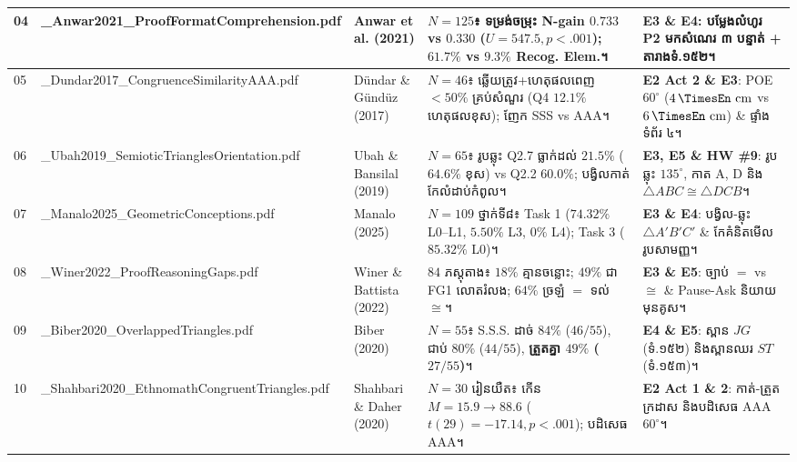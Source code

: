 \documentclass[a4paper,12pt]{article}
\newcommand{\en}[1]{{\TimesEn #1}}
\newcommand{\unit}[1]{\,\text{\en{#1}}}
\newcommand{\tri}[1]{\ensuremath{\triangle #1}}
\newcommand{\cg}{\ensuremath{\cong}}
\begin{document}
\begin{longtable}{|C{0.65cm}|L{4.05cm}|L{2.55cm}|L{5.35cm}|L{3.90cm}|}
04 & \en{04\_\allowbreak Anwar2021\_\allowbreak ProofFormat\allowbreak Comprehension.pdf} & \en{Anwar et al. (2021)} &
$N=125$៖ ទម្រង់ចម្រុះ \en{N-gain} $0.733$ vs $0.330$ ($U=547.5, p<.001$); $61.7\%$ vs $9.3\%$ \en{Recog. Elem.}។ &
\textbf{E3 \& E4}: បម្លែងលំហូរ \en{P2} មកសំណេរ ៣ បន្ទាត់ + តារាងទំ.១៥២។ \\ \hline

05 & \en{05\_\allowbreak Dundar2017\_\allowbreak Congruence\allowbreak SimilarityAAA.pdf} & \en{Dündar \& Gündüz (2017)} &
$N=46$៖ ឆ្លើយត្រូវ+ហេតុផលពេញ $<50\%$ គ្រប់សំណួរ (\en{Q4} $12.1\%$ ហេតុផលខុស); ញែក \en{SSS} vs \en{AAA}។ &
\textbf{E2 Act 2 \& E3}: \en{POE} $60^\circ$ ($4\unit{cm}$ vs $6\unit{cm}$) \& ផ្ទាំងទំព័រ ៤។ \\ \hline

06 & \en{06\_\allowbreak Ubah2019\_\allowbreak SemioticTriangles\allowbreak Orientation.pdf} & \en{Ubah \& Bansilal (2019)} &
$N=65$៖ រូបឆ្លុះ \en{Q2.7} ធ្លាក់ដល់ $21.5\%$ ($64.6\%$ ខុស) vs \en{Q2.2} $60.0\%$; បង្វិលកាត់កែលំដាប់កំពូល។ &
\textbf{E3, E5 \& HW \#9}: រូបឆ្លុះ $135^\circ$, កាត \en{A, D} និង $\tri{ABC}\cg\tri{DCB}$។ \\ \hline

07 & \en{07\_\allowbreak Manalo2025\_\allowbreak Geometric\allowbreak Conceptions.pdf} & \en{Manalo (2025)} &
$N=109$ ថ្នាក់ទី៨៖ \en{Task 1} ($74.32\%$ \en{L0--L1}, $5.50\%$ \en{L3}, $0\%$ \en{L4}); \en{Task 3} ($85.32\%$ \en{L0})។ &
\textbf{E3 \& E4}: បង្វិល-ឆ្លុះ $\tri{A'B'C'}$ \& កែគំនិតមើលរូបសាមញ្ញ។ \\ \hline

08 & \en{08\_\allowbreak Winer2022\_\allowbreak ProofReasoning\allowbreak Gaps.pdf} & \en{Winer \& Battista (2022)} &
$84$ ភស្តុតាង៖ $18\%$ គ្មានចន្លោះ; $49\%$ ជា \en{FG1} លោតរំលង; $64\%$ ច្រឡំ $=$ ទល់ $\cg$។ &
\textbf{E3 \& E5}: ច្បាប់ $=$ vs $\cg$ \& \en{Pause-Ask} និយាយមុនគូស។ \\ \hline

09 & \en{09\_\allowbreak Biber2020\_\allowbreak Overlapped\allowbreak Triangles.pdf} & \en{Biber (2020)} &
$N=55$៖ \en{S.S.S.} ដាច់ $84\%$ ($46/55$), ជាប់ $80\%$ ($44/55$), \textbf{ត្រួតគ្នា $49\%$ ($27/55$)}។ &
\textbf{E4 \& E5}: ស្ពាន $JG$ (ទំ.១៥២) និងស្ពានឈរ $ST$ (ទំ.១៥៣)។ \\ \hline

10 & \en{10\_\allowbreak Shahbari2020\_\allowbreak Ethnomath\allowbreak CongruentTriangles.pdf} & \en{Shahbari \& Daher (2020)} &
$N=30$ រៀនយឺត៖ កើន $M=15.9 \to 88.6$ ($t(29)=-17.14, p<.001$); បដិសេធ \en{AAA}។ &
\textbf{E2 Act 1 \& 2}: កាត់-ត្រួតក្រដាស និងបដិសេធ \en{AAA} $60^\circ$។ \\ \hline


\end{longtable}
\end{document}

